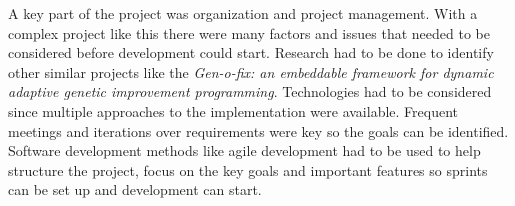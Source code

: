 A key part of the project was organization and project management. With a complex project like this there were many
factors and issues that needed to be considered before development could start. Research had to be done to identify
other similar projects like the \textit{Gen-o-fix: an embeddable framework for dynamic adaptive genetic improvement programming}.
Technologies had to be considered since multiple approaches to the implementation were available. Frequent meetings and 
iterations over requirements were key so the goals can be identified. Software development methods like agile development had to be used to help structure the
project, focus on the key goals and important features so sprints can be set up and development can start.